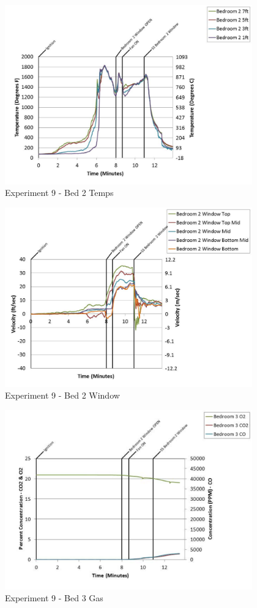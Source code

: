 \documentclass{article}
\begin{document}
\begin{appendices}
	\clearpage

	\begin{figure}[h!]
		\centering
		\includegraphics[height=3.05in]{0_Images/Results_Charts/Exp_9_Charts/Bed2Temps.pdf}
		\caption{Experiment 9 - Bed 2 Temps}
	\end{figure}
 

	\begin{figure}[h!]
		\centering
		\includegraphics[height=3.05in]{0_Images/Results_Charts/Exp_9_Charts/Bed2Window.pdf}
		\caption{Experiment 9 - Bed 2 Window}
	\end{figure}
 
	\clearpage

	\begin{figure}[h!]
		\centering
		\includegraphics[height=3.05in]{0_Images/Results_Charts/Exp_9_Charts/Bed3Gas.pdf}
		\caption{Experiment 9 - Bed 3 Gas}
	\end{figure}
 


\end{appendices}
\end{document}
